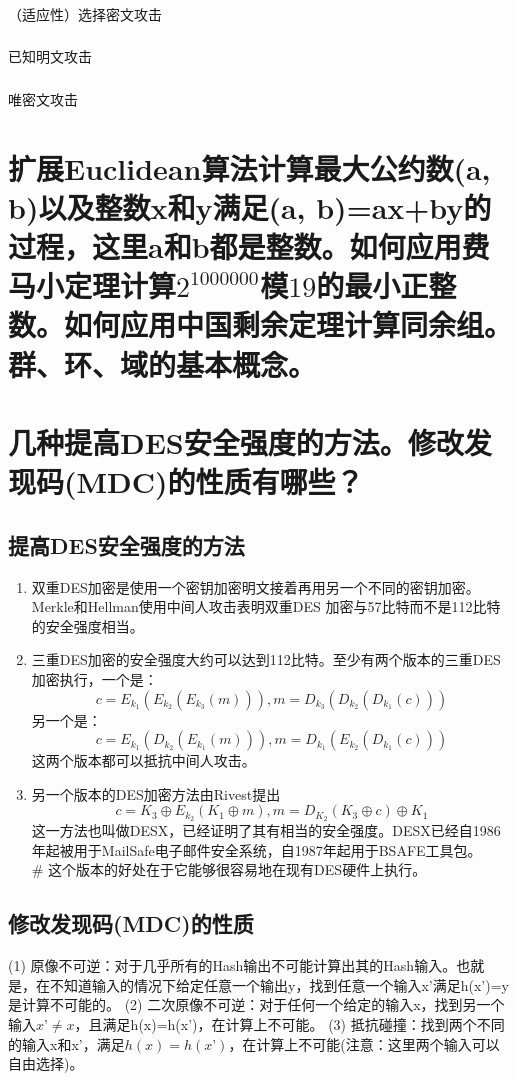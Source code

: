 \documentclass[11pt,a4paper]{article}
\begin{document}
\subsubsection{}（适应性）选择密文攻击
\subsubsection{}已知明文攻击
\subsubsection{}唯密文攻击

\section{扩展Euclidean算法计算最大公约数(a, b)以及整数x和y满足(a, b)=ax+by的过程，这里a和b都是整数。如何应用费马小定理计算$2^{1000000}$模$19$的最小正整数。如何应用中国剩余定理计算同余组。群、环、域的基本概念。}

\section{几种提高DES安全强度的方法。修改发现码(MDC)的性质有哪些？}
\subsection{提高DES安全强度的方法}
\begin{enumerate}[1)]
\item 双重DES加密是使用一个密钥加密明文接着再用另一个不同的密钥加密。Merkle和Hellman使用中间人攻击表明双重DES 加密与57比特而不是112比特的安全强度相当。
\item 三重DES加密的安全强度大约可以达到112比特。至少有两个版本的三重DES加密执行，一个是：
$$ c = E_{k_1}(E_{k_2}(E_{k_3}(m))), m=D_{k_3}(D_{k_2}(D_{k_1}(c)))$$
另一个是：
$$ c = E_{k_1}(D_{k_2}(E_{k_1}(m))), m=D_{k_1}(E_{k_2}(D_{k_1}(c))) $$
这两个版本都可以抵抗中间人攻击。
\item 另一个版本的DES加密方法由Rivest提出
$$ c=K_3 \oplus E_{k_2}(K_1\oplus m), m=D_{K_2}(K_3 \oplus c) \oplus K_1$$
这一方法也叫做DESX，已经证明了其有相当的安全强度。DESX已经自1986年起被用于MailSafe电子邮件安全系统，自1987年起用于BSAFE工具包。\\
\# 这个版本的好处在于它能够很容易地在现有DES硬件上执行。
\end{enumerate}
\subsection{修改发现码(MDC)的性质}
(1) 原像不可逆：对于几乎所有的Hash输出不可能计算出其的Hash输入。也就是，在不知道输入的情况下给定任意一个输出y，找到任意一个输入x’满足h(x’)=y 是计算不可能的。
(2) 二次原像不可逆：对于任何一个给定的输入x，找到另一个输入$x’\ne x$，且满足h(x)=h(x’)，在计算上不可能。
(3) 抵抗碰撞：找到两个不同的输入x和x’，满足$h(x)=h(x’)$，在计算上不可能(注意：这里两个输入可以自由选择)。
\end{document}
